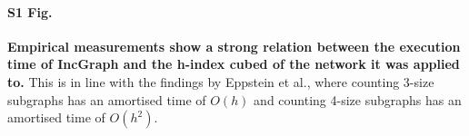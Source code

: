 \paragraph*{S1 Fig.}
\label{sfig_hindex}
{\bf Empirical measurements show a strong relation between the execution time of IncGraph and the h-index cubed of the network it was applied to.} This is in line with the findings by Eppstein et al., where counting 3-size subgraphs has an amortised time of $O(h)$ and counting 4-size subgraphs has an amortised time of $O(h^2)$.

